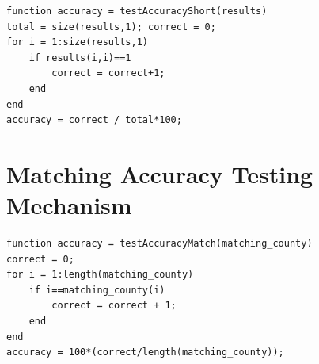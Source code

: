 \documentclass[12pt]{uthesis-v12}  %
\begin{document}
\begin{verbatim}
function accuracy = testAccuracyShort(results)
total = size(results,1); correct = 0; 
for i = 1:size(results,1)
    if results(i,i)==1
        correct = correct+1;
    end
end
accuracy = correct / total*100;
\end{verbatim}

\section{Matching Accuracy Testing Mechanism}

\begin{verbatim}
function accuracy = testAccuracyMatch(matching_county)
correct = 0;
for i = 1:length(matching_county)
    if i==matching_county(i)
        correct = correct + 1;
    end
end
accuracy = 100*(correct/length(matching_county));
\end{verbatim}





\end{document}
